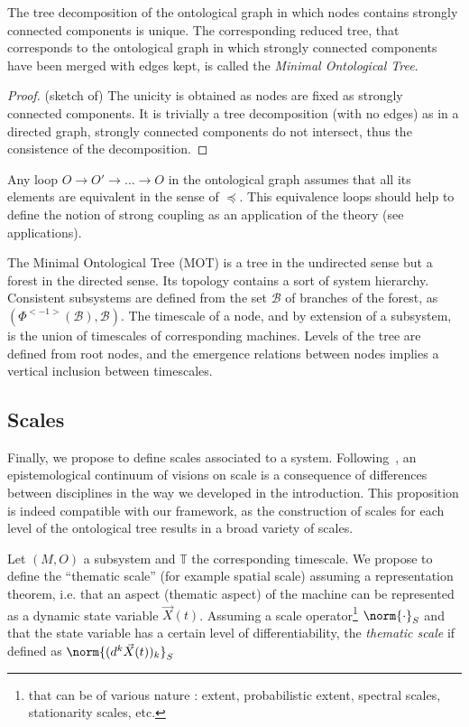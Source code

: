 \begin{proposition}
The tree decomposition of the ontological graph in which nodes contains strongly connected components is unique. The corresponding reduced tree, that corresponds to the ontological graph in which strongly connected components have been merged with edges kept, is called the \emph{Minimal Ontological Tree}.
\end{proposition}

\begin{proof}
(sketch of) The unicity is obtained as nodes are fixed as strongly connected components. It is trivially a tree decomposition (with no edges) as in a directed graph, strongly connected components do not intersect, thus the consistence of the decomposition.
\end{proof}

Any loop $O \rightarrow O' \rightarrow \ldots \rightarrow O$ in the ontological graph assumes that all its elements are equivalent in the sense of $\preccurlyeq$. This equivalence loops should help to define the notion of strong coupling as an application of the theory (see applications).

\medskip

The Minimal Ontological Tree (MOT) is a tree in the undirected sense but a forest in the directed sense. Its topology contains a sort of system hierarchy. Consistent subsystems are defined from the set $\mathcal{B}$ of branches of the forest, as $(\Phi^{<-1>}(\mathcal{B}),\mathcal{B})$. The timescale of a node, and by extension of a subsystem, is the union of timescales of corresponding machines. Levels of the tree are defined from root nodes, and the emergence relations between nodes implies a vertical inclusion between timescales.



\subsection*{Scales}

Finally, we propose to define scales associated to a system. Following~\cite{manson2008does}, an epistemological continuum of visions on scale is a consequence of differences between disciplines in the way we developed in the introduction. This proposition is indeed compatible with our framework, as the construction of scales for each level of the ontological tree results in a broad variety of scales.

Let $(M,O)$ a subsystem and $\mathbb{T}$ the corresponding timescale. We propose to define the ``thematic scale'' (for example spatial scale) assuming a representation theorem, i.e. that an aspect (thematic aspect) of the machine can be represented as a dynamic state variable $\vec{X}(t)$. Assuming a scale operator\footnote{that can be of various nature : extent, probabilistic extent, spectral scales, stationarity scales, etc.} $\norm{\cdot}_{S}$ and that the state variable has a certain level of differentiability, the \emph{thematic scale} if defined as $\norm{(d^k \vec{X}(t))_k}_S$


